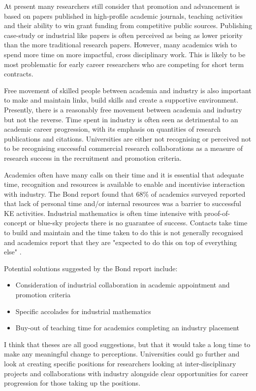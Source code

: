 \documentclass[11pt]{article} %
\begin{document}
	At present many researchers still consider that promotion and advancement is based on papers published in high-profile academic journals, teaching activities and their ability to win grant funding from competitive public sources. Publishing case-study or industrial like papers is often perceived as being as lower priority than the more traditional research papers. However, many academics wish to spend more time on more impactful, cross disciplinary work. This is likely to be most problematic for early career researchers who are competing for short term contracts. 
	
	Free movement of skilled people between academia and industry is also important to make and maintain links, build skills and create a supportive environment. Presently, there is a reasonably free movement between academia and industry but not the reverse. Time spent in industry is often seen as detrimental to an academic career progression, with its  emphasis on  quantities of research publications and citations.  Universities are either not recognising or perceived not to be recognising successful commercial research collaborations as a measure of research success in the recruitment and promotion criteria. 
	
	Academics often have many calls on their time and it is essential that adequate time, recognition and resources is available to enable and incentivise interaction with industry. The Bond report \cite{Bond} found that  68\% of academics surveyed reported that lack of personal time and/or internal resources was a barrier to successful KE activities.  
	Industrial mathematics is often time intensive with proof-of-concept or blue-sky projects there is no guarantee of success. Contacts take time to build and maintain and the time taken to do this is not generally recognised and academics report that they are "expected to do this on top of everything else" \cite{Bond}.
	
	Potential solutions suggested by the Bond report include: 
	\begin{itemize}
		\item Consideration of industrial collaboration in academic appointment and promotion criteria
		\item Specific accolades for industrial mathematics
		\item Buy-out of teaching time for academics completing an industry placement
	\end{itemize} 

I think that theses are all good suggestions, but that it would take a long time to make any meaningful change to perceptions. Universities could go further and look at creating specific positions  for researchers looking at inter-disciplinary projects and collaborations with industry alongside clear opportunities for career progression for those taking up the positions. 
\end{document}
